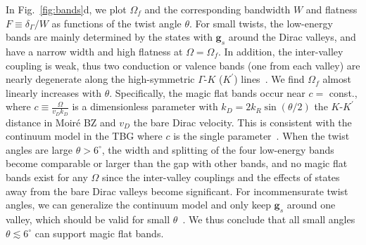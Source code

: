 \documentclass[twocolumn,english,prl,floatfix,citeautoscript,nofootinbib]{revtex4}
\begin{document}
In Fig.~\ref{fig:bands}d, we plot $\Omega _{f}$ and the corresponding
bandwidth $W$ and flatness $F\equiv \delta _{\Gamma }/W$ as functions of the
twist angle $\theta $. %
For small twists, the low-energy bands are mainly determined by the
states with $\mathbf{g}_{s}$ around the Dirac valleys, and have a
narrow width and high flatness at $\Omega =\Omega _{f}$. In addition, the
inter-valley coupling is weak, %
thus two conduction or valence bands (one from each valley) are nearly
degenerate along the high-symmetric $\Gamma $-$K$ ($K^{\prime }$) lines~\cite%
{PhysRevLett.122.026801}. %
We find $\Omega _{f}$ almost linearly increases with $\theta $.
Specifically, the magic flat bands occur near $c =$ const., where $%
c \equiv \frac{\Omega }{v_{D}k_{D}}$ is a dimensionless parameter with $%
k_{D}=2k_{R}\sin (\theta /2)$ the $K$-$K^{\prime }$ distance in Moir\'{e} BZ
and $v_{D}$ the bare Dirac velocity. %
This is consistent with the continuum model in the TBG where $c $ is
the single parameter~\cite{PNAS.108.12233,PhysRevB.86.155449}. When the
twist angles are large $\theta >6^{\circ }$, the width and splitting of the
four low-energy bands become comparable or larger than the gap with other
bands, and no magic flat bands exist for any $\Omega $ since the
inter-valley couplings and the effects of states %
away from the bare Dirac valleys become significant. %
For incommensurate twist angles, we can generalize the continuum model and
only keep $\mathbf{g}_{s}$ around one valley, which should be valid for
small $\theta $~\cite{SM}.
We thus conclude that all small angles $\theta \lesssim 6^{\circ }$ can
support magic flat bands. %
\end{document}
